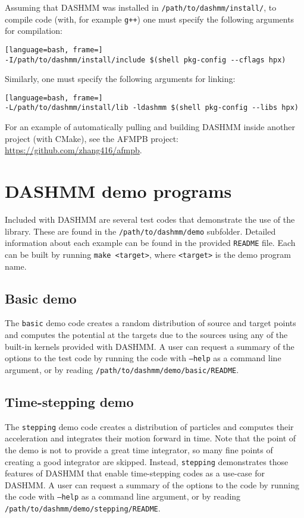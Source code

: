 Assuming that DASHMM was installed in {\tt /path/to/dashmm/install/}, to
compile code (with, for example {\tt g++}) one must specify the following
arguments for compilation:

\begin{lstlisting}[language=bash, frame=]
-I/path/to/dashmm/install/include $(shell pkg-config --cflags hpx)
\end{lstlisting}

\noindent Similarly, one must specify the following arguments for linking:

\begin{lstlisting}[language=bash, frame=]
-L/path/to/dashmm/install/lib -ldashmm $(shell pkg-config --libs hpx)
\end{lstlisting}

For an example of automatically pulling and building DASHMM inside another
project (with CMake), see the AFMPB project:
\url{https://github.com/zhang416/afmpb}.

\section{DASHMM demo programs}

Included with DASHMM are several test codes that demonstrate the use
of the library. These are found in the {\tt /path/to/dashmm/demo}
subfolder. Detailed information about each example can be found in
the provided {\tt README} file. Each can be built by running
{\tt make <target>}, where {\tt <target>} is the demo program name.

\subsection{Basic demo}
The {\tt basic} demo code creates a random distribution of source and
target points and computes the potential at the targets due to the
sources using any of the built-in kernels provided with DASHMM. A user
can request a summary of the options to the test code by running the
code with {\tt --help} as a command line argument, or by reading
{\tt /path/to/dashmm/demo/basic/README}.

\subsection{Time-stepping demo}
The {\tt stepping} demo code creates a distribution of particles and
computes their acceleration and integrates their motion forward in
time. Note that the point of the demo is not to provide a great time
integrator, so many fine points of creating a good integrator are
skipped. Instead, {\tt stepping} demonstrates those features of DASHMM
that enable time-stepping codes as a use-case for DASHMM. A user can
request a summary of the options to the code by running the code with
{\tt --help} as a command line argument, or by reading
{\tt /path/to/dashmm/demo/stepping/README}.

